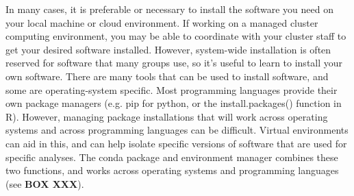\documentclass[10pt,letterpaper]{article}
\begin{document}
In many cases, it is preferable or necessary to install the software you need on your local machine or cloud environment. 
If working on a managed cluster computing environment, you may be able to coordinate with your cluster staff to get your desired software installed. 
However, system-wide installation is often reserved for software that many groups use, so it’s useful to learn to install your own software. 
There are many tools that can be used to install software, and some are operating-system specific. 
Most programming languages provide their own package managers (e.g. pip for python, or the install.packages() function in R). 
However, managing package installations that will work across operating systems and across programming languages can be difficult. 
Virtual environments can aid in this, and can help isolate specific versions of software that are used for specific analyses. 
The conda package and environment manager combines these two functions, and works across operating systems and programming languages (see \textbf{BOX XXX}). 
\end{document}
